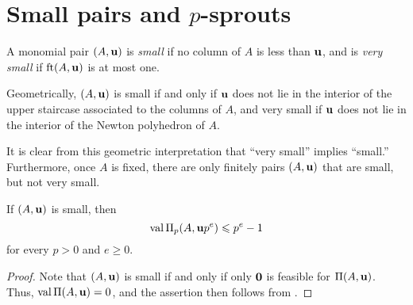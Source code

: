 \documentclass[11pt]{amsart}
\begin{document}
\section{Small pairs and $p$-sprouts}

 
\begin{definition}
A monomial pair $(A, \mathbf{u})$ is \emph{small} if no column of $A$ is less than $\mathbf{u}$, and is \emph{very small} if $\operatorname{ft}(A, \mathbf{u})$ is at most one.
\end{definition}

\begin{remark}
\label{finitely many small but not very small: R}
Geometrically, $(A, \mathbf{u})$ is small if and only if $\mathbf{u}$ does not lie in the interior of the upper staircase associated to the columns of $A$, and very small if $\mathbf{u}$ does not lie in the interior of the Newton polyhedron of $A$.  

It is clear from this geometric interpretation that ``very small'' implies ``small.''  Furthermore, once $A$ is fixed, there are only finitely pairs $(A, \mathbf{u})$ that are small, but not very small. 
\end{remark}

\begin{lemma}
\label{trivial value bound: L}
If $(A, \mathbf{u})$ is small, then 
 \[ \operatorname{val} \Pi_p(A, \mathbf{u}p^e) \leqslant p^{e} -1 \] for every $p > 0$ and $e \geq 0$.
\end{lemma}


\begin{proof}
Note that $(A, \mathbf{u})$ is small if and only if only $\mathbf{0}$ is feasible for $\Pi(A, \mathbf{u})$.   Thus, $\operatorname{val} \Pi(A, \mathbf{u}) = 0$, and the assertion then follows from .
\end{proof}


\end{document}
